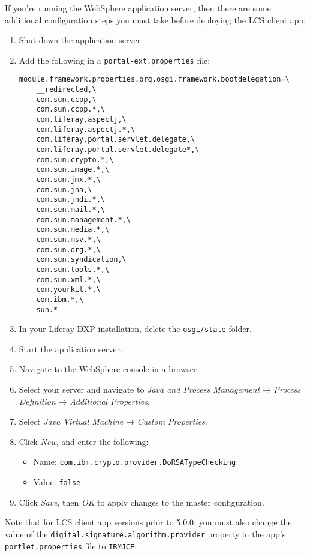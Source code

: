 If you're running the WebSphere application server, then there are some
additional configuration steps you must take before deploying the LCS
client app:

\begin{enumerate}
\def\labelenumi{\arabic{enumi}.}
\item
  Shut down the application server.
\item
  Add the following in a \texttt{portal-ext.properties} file:

\begin{verbatim}
module.framework.properties.org.osgi.framework.bootdelegation=\
    __redirected,\
    com.sun.ccpp,\
    com.sun.ccpp.*,\
    com.liferay.aspectj,\
    com.liferay.aspectj.*,\
    com.liferay.portal.servlet.delegate,\
    com.liferay.portal.servlet.delegate*,\
    com.sun.crypto.*,\
    com.sun.image.*,\
    com.sun.jmx.*,\
    com.sun.jna,\
    com.sun.jndi.*,\
    com.sun.mail.*,\
    com.sun.management.*,\
    com.sun.media.*,\
    com.sun.msv.*,\
    com.sun.org.*,\
    com.sun.syndication,\
    com.sun.tools.*,\
    com.sun.xml.*,\
    com.yourkit.*,\
    com.ibm.*,\
    sun.*
\end{verbatim}
\item
  In your Liferay DXP installation, delete the \texttt{osgi/state}
  folder.
\item
  Start the application server.
\item
  Navigate to the WebSphere console in a browser.
\item
  Select your server and navigate to \emph{Java and Process Management}
  → \emph{Process Definition} → \emph{Additional Properties}.
\item
  Select \emph{Java Virtual Machine} → \emph{Custom Properties}.
\item
  Click \emph{New}, and enter the following:

  \begin{itemize}
  \tightlist
  \item
    Name: \texttt{com.ibm.crypto.provider.DoRSATypeChecking}
  \item
    Value: \texttt{false}
  \end{itemize}
\item
  Click \emph{Save}, then \emph{OK} to apply changes to the master
  configuration.
\end{enumerate}

Note that for LCS client app versions prior to 5.0.0, you must also
change the value of the \texttt{digital.signature.algorithm.provider}
property in the app's \texttt{portlet.properties} file to
\texttt{IBMJCE}:

